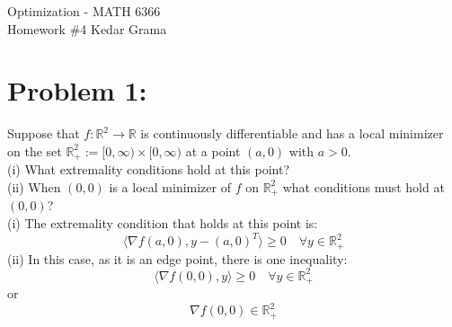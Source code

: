 \documentclass[12pt]{report}
\begin{document}
\begin{center}
	\large{Optimization - MATH 6366}\\
	\hfill \hfill \large{Homework \#4} \hfill \large{Kedar Grama}\\
\end{center}

\section*{Problem 1:}
Suppose that $f:\mathbb{R}^2\rightarrow\mathbb{R}$ is continuously differentiable and
has a local minimizer on the set $\mathbb{R}^2_+:=[0,\infty)\times [0,\infty)$ at a
point $(a,0)$ with $a>0$.\\
(i) What extremality conditions hold at this point? \\
(ii) When $(0, 0)$ is a local minimizer of $f$ on $\mathbb{R}^2_+$ what conditions must
hold at $(0, 0)$?\\
(i) The extremality condition that holds at this point is:
$$ \langle \nabla f(a,0), y-(a,0)^T \rangle \geq 0 \quad \forall y \in \mathbb{R}^2_+ $$
(ii) In this case, as it is an edge point, there is one inequality:
$$\langle \nabla f(0,0), y \rangle  \geq 0 \quad \forall y \in \mathbb{R}^2_+$$
or
$$ \nabla f(0,0) \in \mathbb{R}^2_+ $$
\end{document}
